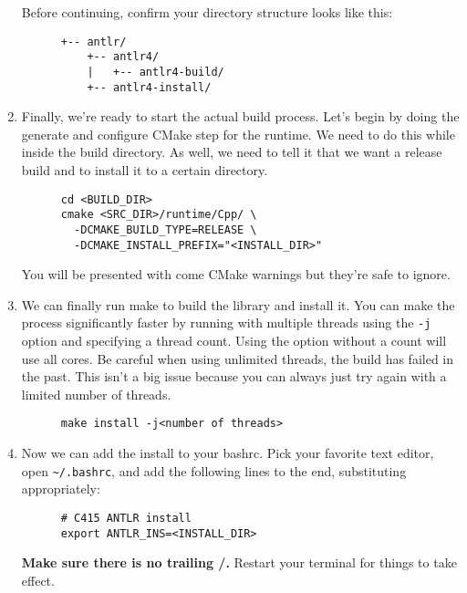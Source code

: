 \documentclass[../setup.tex]{subfiles}
\begin{document}
\begin{enumerate}
    Before continuing, confirm your directory structure looks like this:
    \begin{lstlisting}
      +-- antlr/
          +-- antlr4/
          |   +-- antlr4-build/
          +-- antlr4-install/
    \end{lstlisting}
  \item
    Finally, we're ready to start the actual build process. Let's begin by doing the generate and
    configure CMake step for the runtime. We need to do this while inside the build directory. As
    well, we need to tell it that we want a release build and to install it to a certain directory.
    \begin{lstlisting}
      cd <BUILD_DIR>
      cmake <SRC_DIR>/runtime/Cpp/ \
        -DCMAKE_BUILD_TYPE=RELEASE \
        -DCMAKE_INSTALL_PREFIX="<INSTALL_DIR>"
    \end{lstlisting}
    You will be presented with come CMake warnings but they're safe to ignore.
  \item
    We can finally run make to build the library and install it. You can make the process
    significantly faster by running with multiple threads using the \lstinline{-j} option and
    specifying a thread count. Using the option without a count will use all cores. Be careful when
    using unlimited threads, the build has failed in the past. This isn't a big issue because you
    can always just try again with a limited number of threads.
    \begin{lstlisting}
      make install -j<number of threads>
    \end{lstlisting}
  \item
    Now we can add the install to your bashrc. Pick your favorite text editor, open
    \lstinline{~/.bashrc}, and add the following lines to the end, substituting
    appropriately:
    \begin{lstlisting}
      # C415 ANTLR install
      export ANTLR_INS=<INSTALL_DIR>
    \end{lstlisting}
    \textbf{Make sure there is no trailing /.} Restart your terminal for things to take effect.
\end{enumerate}
\end{document}
